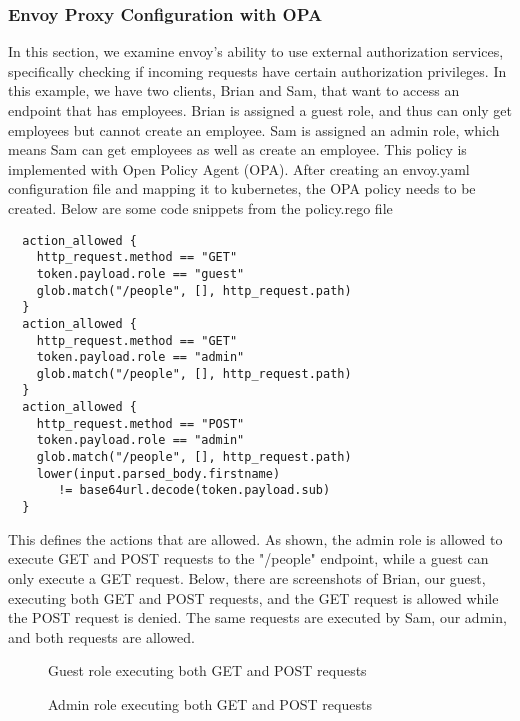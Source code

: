 \subsubsection{Envoy Proxy Configuration with OPA}
In this section, we examine envoy's ability to use external authorization services, specifically checking
if incoming requests have certain authorization privileges. In this example, we have two clients, Brian and Sam, that
want to access an endpoint that has employees. Brian is assigned a guest role, and thus can only get employees but cannot
create an employee. Sam is assigned an admin role, which means Sam can get employees as well as create an employee. This policy
is implemented with Open Policy Agent (OPA). After creating an envoy.yaml configuration file and mapping it to kubernetes,
the OPA policy needs to be created. Below are some code snippets from the policy.rego file
\begin{verbatim}
  action_allowed {
    http_request.method == "GET"
    token.payload.role == "guest"
    glob.match("/people", [], http_request.path)
  }
  action_allowed {
    http_request.method == "GET"
    token.payload.role == "admin"
    glob.match("/people", [], http_request.path)
  }
  action_allowed {
    http_request.method == "POST"
    token.payload.role == "admin"
    glob.match("/people", [], http_request.path)
    lower(input.parsed_body.firstname) 
       != base64url.decode(token.payload.sub)
  }
\end{verbatim}
This defines the actions that are allowed. As shown, the admin role is allowed to execute GET and POST requests to the "/people" endpoint, while
a guest can only execute a GET request. Below, there are screenshots of Brian, our guest, executing both GET and POST requests, and the GET request
is allowed while the POST request is denied. The same requests are executed by Sam, our admin, and both requests are allowed.

\onecolumn

\begin{figure}[t]
  \begin{center}
    \vspace{-0.2in}
    \caption{Guest role executing both GET and POST requests}
    \label{fig:opa-guest}
  \end{center}
\end{figure}

\begin{figure}[t]
  \begin{center}
    \vspace{-0.2in}
    \caption{Admin role executing both GET and POST requests}
    \label{fig:opa-admin}
  \end{center}
\end{figure}

\twocolumn
